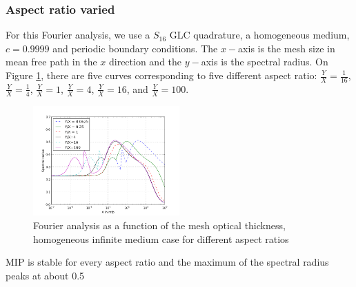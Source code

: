 \subsubsection{Aspect ratio varied}
For this Fourier analysis, we use a $S_{16}$ GLC quadrature, a homogeneous
medium, $c=0.9999$ and periodic boundary conditions. The $x-$axis is the mesh
size in mean free path in the $x$ direction and the $y-$axis is the spectral
radius. On Figure \ref{fig_fa_ar}, there are five curves corresponding to five 
different aspect ratio: $\frac{Y}{X}=\frac{1}{16}$, $\frac{Y}{X}=\frac{1}{4}$, 
$\frac{Y}{X}=1$, $\frac{Y}{X}=4$, $\frac{Y}{X}=16$, and $\frac{Y}{X}=100$. 
\begin{figure}[H]
  \centering
  \includegraphics[width=0.5\textwidth]{./Dsa/aspect_ratio_9999_2}
  \caption{Fourier analysis as a function of the mesh optical thickness,
  homogeneous infinite medium case for different aspect ratios}
  \label{fig_fa_ar}
\end{figure}
MIP is stable for every aspect ratio and the maximum of the spectral radius
peaks at about 0.5

